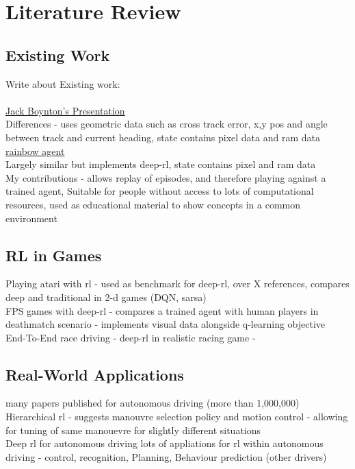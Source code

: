 
\chapter{Literature Review}
\section{Existing Work}
Write about Existing work:
\\ \cite{BenJMiddleton}
\\ \href{https://github.com/JackWBoynton/mariokart-rl}{Jack Boynton's Presentation}
\\ Differences - uses geometric data such as cross track error, x,y pos and angle between track and current heading, state contains pixel data and ram data\\
\href{https://github.com/benjaminjmiddleton/mkw_ai_env/blob/main/README.md}{rainbow agent}
\\ Largely similar but implements deep-rl, state contains pixel and ram data
\\ My contributions - allows replay of episodes, and therefore playing against a trained agent, 
Suitable for people without access to lots of computational resources, used as educational material to show concepts in a common environment

\section{RL in Games}

\cite{mnih2013playing}Playing atari with rl - used as benchmark for deep-rl, over X references, compares deep and traditional in 2-d games (DQN, sarsa)\\
FPS games with deep-rl - compares a trained agent with human players in deathmatch scenario - implements visual data alongside q-learning objective\cite{lample2017playing}
\\End-To-End race driving - deep-rl in realistic racing game\cite{8460934} -
\section{Real-World Applications}
many papers published for autonomous driving (more than 1,000,000) 
\\Hierarchical rl - suggests manouvre selection policy and motion control - allowing for tuning of same manouevre for slightly different situations\cite{duan2020hierarchical}
\\Deep rl for autonomous driving \cite{kiran2021deep} lots of appliations for rl within autonomous driving - control, recognition, Planning, Behaviour prediction (other drivers)